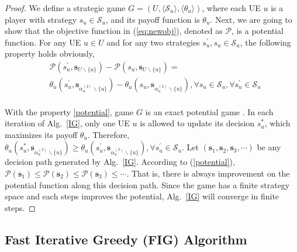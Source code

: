 \documentclass[conference]{IEEEtran}
\begin{document}
\begin{proof}
We define a strategic game $G=(U,\langle \mathcal{S}_u \rangle,\langle\theta_u\rangle)$, where each UE $u$ is a player with strategy $s_u \in \mathcal{S}_u$, and its payoff function is $\theta_u$. Next, we are going to show that the objective function in (\ref{eq:newobj}), denoted as $\mathcal{P}$, is a potential function. For any UE $u\in U$ and for any two strategies $s^{\prime}_u, s_u\in \mathcal{S}_u$, the following property holds obviously,
\begin{equation}
\label{potential}
\begin{split}
& \mathcal{P}(s^{\prime}_u,\boldsymbol{s}_{U\backslash\{u\}})- \mathcal{P}(s_u,\boldsymbol{s}_{U\backslash\{u\}}) = \\
& \theta_u(s^{\prime}_u,\boldsymbol{s}_{\alpha_u^{(2)}\backslash\{u\}}) - \theta_u(s_u,\boldsymbol{s}_{\alpha_u^{(2)}\backslash\{u\}}), \forall s_u \in \mathcal{S}_u, \forall s^{\prime}_u\in \mathcal{S}_u
\end{split}
\end{equation}\\
With the property \eqref{potential}, game $G$ is an exact potential game \cite{monderer1996potential}. In each iteration of Alg.~\ref{IG}, only one UE $u$ is allowed to update its decision $s_u^*$, which maximizes its payoff $\theta_u$. Therefore, $\theta_u(s_u^*, \boldsymbol{s}_{\alpha_u^{(2)}\backslash\{u\}}) \geq \theta_u(s_u^{\prime}, \boldsymbol{s}_{\alpha_u^{(2)}\backslash\{u\}}), \forall s_u^{\prime}\in \mathcal{S}_u$. Let $ (\boldsymbol{s}_1,\boldsymbol{s}_2,\boldsymbol{s}_3,\cdots)$ be any decision path generated by Alg.~\ref{IG}. According to (\ref{potential}), $\mathcal{P}(\boldsymbol{s}_1) \leq \mathcal{P}(\boldsymbol{s}_2) \leq \mathcal{P}(\boldsymbol{s}_3)\leq\cdots$. That is, there is always improvement on the potential function along this decision path. Since the game has a finite strategy space and each steps improves the potential, Alg.~\ref{IG} will converge in finite steps.
\end{proof}


\subsection{Fast Iterative Greedy (FIG) Algorithm }
\end{document}
